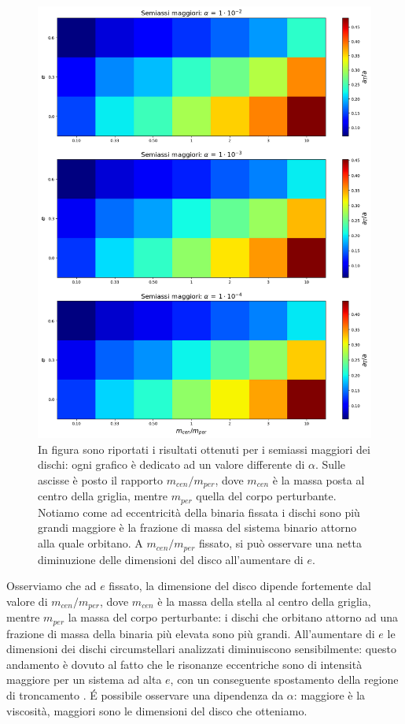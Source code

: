 \documentclass[12pt, a4paper]{report}
\begin{document}
\begin{figure}[h]
    \centering
    \includegraphics[width=\textwidth]{Immagini/graf_riass.png}
    \caption{In figura sono riportati i risultati ottenuti per i semiassi maggiori dei dischi: ogni grafico è dedicato ad un valore differente di $\alpha$. Sulle ascisse è posto il rapporto $m_{cen}/m_{per}$, dove $m_{cen}$ è la massa posta al centro della griglia, mentre $m_{per}$ quella del corpo perturbante. Notiamo come ad eccentricità della binaria fissata i dischi sono più grandi maggiore è la frazione di massa del sistema binario attorno alla quale orbitano. A $m_{cen}/m_{per}$ fissato, si può osservare una netta diminuzione delle dimensioni del disco all'aumentare di $e$.}
    \label{fig:sax_magg}
\end{figure}

Osserviamo che ad $e$ fissato, la dimensione del disco dipende fortemente dal valore di $m_{cen}/m_{per}$, dove $m_{cen}$ è la massa della stella al centro della griglia, mentre $m_{per}$ la massa del corpo perturbante: i dischi che orbitano attorno ad una frazione di massa della binaria più elevata sono più grandi.
All'aumentare di $e$ le dimensioni dei dischi circumstellari analizzati diminuiscono sensibilmente: questo andamento è dovuto al fatto che le risonanze eccentriche sono di intensità maggiore per un sistema ad alta $e$, con un conseguente spostamento della regione di troncamento \parencite{ArtymowiczLubow1994}.
\'E possibile osservare una dipendenza da $\alpha$: maggiore è la viscosità, maggiori sono le dimensioni del disco che otteniamo.
\end{document}
